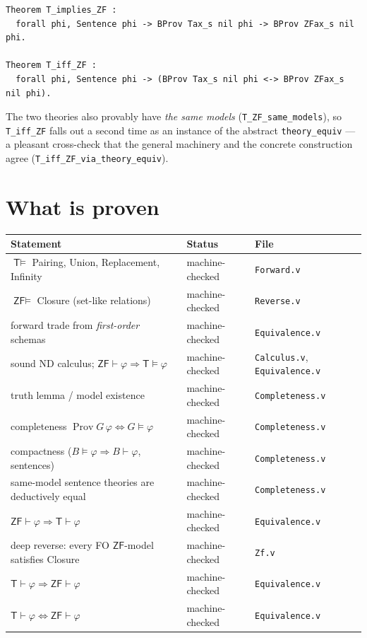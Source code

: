 \documentclass[11pt]{article}
\theoremstyle{plain}
\theoremstyle{definition}
\newcommand{\ZF}{\mathsf{ZF}}
\renewcommand{\ZF}{\textsf{ZF}}
\newcommand{\T}{\textsf{T}}
\newcommand{\proves}{\vdash}
\DeclareMathOperator{\Prov}{Prov}
\newcommand{\cq}[1]{\lstinline[basicstyle=\ttfamily]|#1|}
\begin{document}
\begin{lstlisting}
Theorem T_implies_ZF :
  forall phi, Sentence phi -> BProv Tax_s nil phi -> BProv ZFax_s nil phi.

Theorem T_iff_ZF :
  forall phi, Sentence phi -> (BProv Tax_s nil phi <-> BProv ZFax_s nil phi).
\end{lstlisting}

The two theories also provably have \emph{the same models}
(\cq{T_ZF_same_models}), so \cq{T_iff_ZF} falls out a second time as an
instance of the abstract \cq{theory_equiv} --- a pleasant cross-check that the
general machinery and the concrete construction agree
(\cq{T_iff_ZF_via_theory_equiv}).

\section{What is proven}\label{sec:remaining}

\begin{center}
\renewcommand{\arraystretch}{1.3}
\begin{tabular}{@{}p{}p{}l@{}}
\toprule
Statement & Status & File \\
\midrule
$\T \models$ Pairing, Union, Replacement, Infinity & machine-checked & \texttt{Forward.v} \\
$\ZF \models$ Closure (set-like relations) & machine-checked & \texttt{Reverse.v} \\
forward trade from \emph{first-order} schemas & machine-checked & \texttt{Equivalence.v} \\
sound ND calculus; $\ZF\proves\varphi \Rightarrow \T\models\varphi$ & machine-checked & \texttt{Calculus.v}, \texttt{Equivalence.v} \\
truth lemma / model existence & machine-checked & \texttt{Completeness.v} \\
completeness $\Prov G\,\varphi \Leftrightarrow G\models\varphi$ & machine-checked & \texttt{Completeness.v} \\
compactness ($B\models\varphi \Rightarrow B\proves\varphi$, sentences) & machine-checked & \texttt{Completeness.v} \\
same-model sentence theories are deductively equal & machine-checked & \texttt{Completeness.v} \\
$\ZF \proves \varphi \Rightarrow \T \proves \varphi$ & machine-checked & \texttt{Equivalence.v} \\
deep reverse: every FO $\ZF$-model satisfies Closure & machine-checked & \texttt{Zf.v} \\
$\T \proves \varphi \Rightarrow \ZF \proves \varphi$ & machine-checked & \texttt{Equivalence.v} \\
$\T \proves \varphi \Leftrightarrow \ZF \proves \varphi$ & machine-checked & \texttt{Equivalence.v} \\
\bottomrule
\end{tabular}
\end{center}
\end{document}

